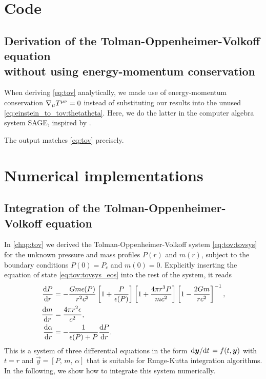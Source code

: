 \chapter{Code}
\label{chap:code}

\section{Derivation of the Tolman-Oppenheimer-Volkoff equation \texorpdfstring{\\}{} without using energy-momentum conservation}
\label{sec:tov_cas_derivation}

When deriving \cref{eq:tov} analytically, we made use of energy-momentum conservation $\nabla_\mu T\indices{^\mu^\nu} = 0$ instead of substituting our results into the unused \cref{eq:einstein_to_tov:thetatheta}.
Here, we do the latter in the computer algebra system SAGE, inspired by \cite{ref:sage_tov}.


The output matches \cref{eq:tov} precisely.

\chapter{Numerical implementations}

\section{Integration of the Tolman-Oppenheimer-Volkoff equation}
\label{sec:nstars:numtov}

In \cref{chap:tov} we derived the Tolman-Oppenheimer-Volkoff system \eqref{eq:tov:tovsys} for the unknown pressure and mass profiles $P(r)$ and $m(r)$, subject to the boundary conditions $P(0) = P_c$ and $m(0) = 0$.
Explicitly inserting the equation of state \eqref{eq:tov:tovsys_eos} into the rest of the system, it reads
\begin{subequations}
\label{eq:numtov:tovsys}
\begin{align}
	\odv{P}{r} &= -\frac{G m \epsilon(P)}{r^2 c^2} \left[ 1 + \frac{P}{\epsilon(P)} \right] \left[ 1 + \frac{4 \pi r^3 P}{m c^2} \right] \left[ 1 - \frac{2 G m}{r c^2} \right]^{-1} , \label{eq:numtov:tov_pressure} \\
	\odv{m}{r} &= \frac{4 \pi r^2 \epsilon}{c^2} , \label{eq:numtov:tov_mass} \\
	\odv{\alpha}{r} &= -\frac{1}{\epsilon(P) + P} \odv{P}{r} . \label{eq:numtov:tov_alpha}
\end{align}
\end{subequations}
This is a system of three differential equations in the form $\odv{\vec{y}}/{t} = f(t, \vec{y})$ with $t=r$ and $\vec{y} = [P,\, m,\, \alpha]$ that is suitable for Runge-Kutta integration algorithms.
In the following, we show how to integrate this system numerically.

